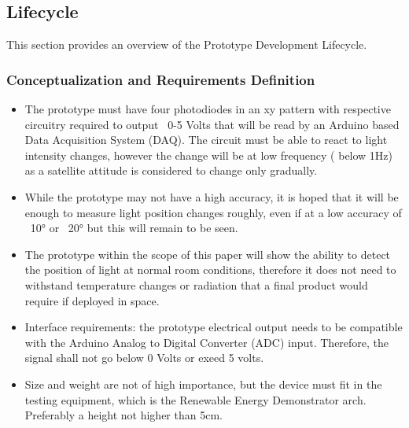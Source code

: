 \subsection{Lifecycle}
This section provides an overview of the Prototype Development Lifecycle.

%         

\subsubsection*{Conceptualization and Requirements Definition}
\begin{itemize}
  \item The prototype must have four photodiodes in an xy pattern with respective circuitry required to output ~0-5 Volts that will be read by an Arduino based Data Acquisition System (DAQ). The circuit must be able to react to light intensity changes, however the change will be at low frequency ( below 1Hz) as a satellite attitude is considered to change only gradually.
  \item While the prototype may not have a high accuracy, it is hoped that it will be enough to measure light position changes roughly, even if at a low accuracy of ~10° or ~20° but this will remain to be seen.  
  \item The prototype within the scope of this paper will show the ability to detect the position of light at normal room conditions, therefore it does not need to withstand temperature changes or radiation that a final product would require if deployed in space.
  \item Interface requirements: the prototype electrical output needs to be compatible with the Arduino Analog to Digital Converter (ADC) input. Therefore, the signal shall not go below 0 Volts or exeed 5 volts. 
  \item Size and weight are not of high importance, but the device must fit in the testing equipment, which is the Renewable Energy Demonstrator arch. Preferably a height not higher than 5cm.
\end{itemize}
